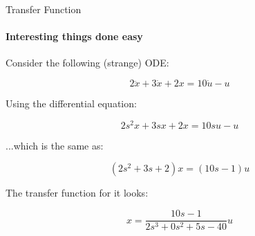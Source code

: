 \documentclass{beamer}
\begin{document}
\begin{frame}{Transfer Function}
\framesubtitle{Interesting things done easy}
\begin{flushleft}

Consider the following (strange) ODE:

\begin{equation}
2\ddot x + 3\dot x + 2 x = 10 \dot u - u
\end{equation}

Using the differential equation:

\begin{equation}
2 s^2 x + 3s x + 2x = 10s u - u
\end{equation}

...which is the same as:

\begin{equation}
(2s^2 + 3s + 2)x = (10s - 1)u
\end{equation}

The transfer function for it looks: 

\begin{equation}
x = \frac{10s - 1}{2 s^3 + 0 s^2 + 5 s - 40} u
\end{equation}

\end{flushleft}
\end{frame}
\end{document}
